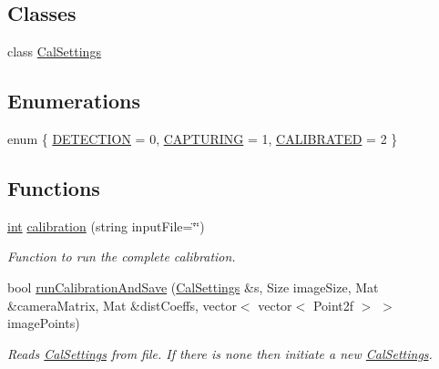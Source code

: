 \subsection*{Classes}
\begin{DoxyCompactItemize}
\item 
class \mbox{\hyperlink{class_cal_settings}{Cal\+Settings}}
\end{DoxyCompactItemize}
\subsection*{Enumerations}
\begin{DoxyCompactItemize}
\item 
enum \{ \mbox{\hyperlink{calibration_8hh_a06fc87d81c62e9abb8790b6e5713c55ba167a7ee1aabe9f27e010fff93c0ba971}{D\+E\+T\+E\+C\+T\+I\+ON}} = 0, 
\mbox{\hyperlink{calibration_8hh_a06fc87d81c62e9abb8790b6e5713c55ba53f5d985011ab26db21516188f46a94f}{C\+A\+P\+T\+U\+R\+I\+NG}} = 1, 
\mbox{\hyperlink{calibration_8hh_a06fc87d81c62e9abb8790b6e5713c55baf7834eaf5a327e180e039aa05dd3ebd1}{C\+A\+L\+I\+B\+R\+A\+T\+ED}} = 2
 \}
\end{DoxyCompactItemize}
\subsection*{Functions}
\begin{DoxyCompactItemize}
\item 
\mbox{\hyperlink{draw_8hh_aa620a13339ac3a1177c86edc549fda9b}{int}} \mbox{\hyperlink{calibration_8hh_aad0d20455c4c17ca2922fec15835fe94}{calibration}} (string input\+File=\char`\"{}\char`\"{})
\begin{DoxyCompactList}\small\item\em Function to run the complete calibration. \end{DoxyCompactList}\item 
bool \mbox{\hyperlink{calibration_8hh_a4195037da024926ac4f645bd09700052}{run\+Calibration\+And\+Save}} (\mbox{\hyperlink{class_cal_settings}{Cal\+Settings}} \&s, Size image\+Size, Mat \&camera\+Matrix, Mat \&dist\+Coeffs, vector$<$ vector$<$ Point2f $>$ $>$ image\+Points)
\begin{DoxyCompactList}\small\item\em Reads \mbox{\hyperlink{class_cal_settings}{Cal\+Settings}} from file. If there is none then initiate a new {\ttfamily \mbox{\hyperlink{class_cal_settings}{Cal\+Settings}}}. \end{DoxyCompactList}\end{DoxyCompactItemize}


